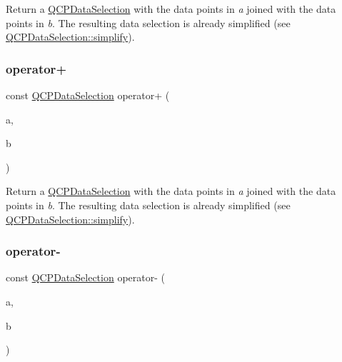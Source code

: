 Return a \mbox{\hyperlink{class_q_c_p_data_selection}{Q\+C\+P\+Data\+Selection}} with the data points in {\itshape a} joined with the data points in {\itshape b}. The resulting data selection is already simplified (see \mbox{\hyperlink{class_q_c_p_data_selection_a4a2fbad1a6e4d1dd26fdfdf88956f2a4}{Q\+C\+P\+Data\+Selection\+::simplify}}). \mbox{\label{class_q_c_p_data_selection_a0822e3133b80b5dedfc8050a19c1e0c5}} 
\subsubsection{\texorpdfstring{operator+}{operator+}\hspace{0.1cm}{\footnotesize\ttfamily [4/4]}}
{\footnotesize\ttfamily const \mbox{\hyperlink{class_q_c_p_data_selection}{Q\+C\+P\+Data\+Selection}} operator+ (\begin{DoxyParamCaption}\item[{const \mbox{\hyperlink{class_q_c_p_data_range}{Q\+C\+P\+Data\+Range}} \&}]{a,  }\item[{const \mbox{\hyperlink{class_q_c_p_data_range}{Q\+C\+P\+Data\+Range}} \&}]{b }\end{DoxyParamCaption})\hspace{0.3cm}{\ttfamily [friend]}}

Return a \mbox{\hyperlink{class_q_c_p_data_selection}{Q\+C\+P\+Data\+Selection}} with the data points in {\itshape a} joined with the data points in {\itshape b}. The resulting data selection is already simplified (see \mbox{\hyperlink{class_q_c_p_data_selection_a4a2fbad1a6e4d1dd26fdfdf88956f2a4}{Q\+C\+P\+Data\+Selection\+::simplify}}). \mbox{\label{class_q_c_p_data_selection_a41147ef7d6303c746e398278b7b624d1}} 
\subsubsection{\texorpdfstring{operator-\/}{operator-}\hspace{0.1cm}{\footnotesize\ttfamily [1/4]}}
{\footnotesize\ttfamily const \mbox{\hyperlink{class_q_c_p_data_selection}{Q\+C\+P\+Data\+Selection}} operator-\/ (\begin{DoxyParamCaption}\item[{const \mbox{\hyperlink{class_q_c_p_data_selection}{Q\+C\+P\+Data\+Selection}} \&}]{a,  }\item[{const \mbox{\hyperlink{class_q_c_p_data_selection}{Q\+C\+P\+Data\+Selection}} \&}]{b }\end{DoxyParamCaption})\hspace{0.3cm}{\ttfamily [friend]}}

